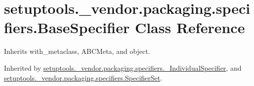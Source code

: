 \hypertarget{classsetuptools_1_1__vendor_1_1packaging_1_1specifiers_1_1_base_specifier}{}\section{setuptools.\+\_\+vendor.\+packaging.\+specifiers.\+Base\+Specifier Class Reference}
\label{classsetuptools_1_1__vendor_1_1packaging_1_1specifiers_1_1_base_specifier}


Inherits with\+\_\+metaclass, A\+B\+C\+Meta, and object.



Inherited by \hyperlink{classsetuptools_1_1__vendor_1_1packaging_1_1specifiers_1_1___individual_specifier}{setuptools.\+\_\+vendor.\+packaging.\+specifiers.\+\_\+\+Individual\+Specifier}, and \hyperlink{classsetuptools_1_1__vendor_1_1packaging_1_1specifiers_1_1_specifier_set}{setuptools.\+\_\+vendor.\+packaging.\+specifiers.\+Specifier\+Set}.

